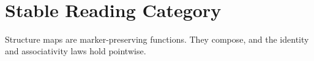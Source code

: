 \documentclass[11pt]{article}
\begin{document}
\begin{code}
\AgdaSpace{}%
\AgdaSpace{}%
\<%
\\
%
\>[2]\AgdaSymbol{;}\AgdaSpace{}%
%
\>[23]\AgdaSymbol{=}\AgdaSpace{}%
\AgdaSpace{}%
\AgdaSpace{}%
\AgdaSpace{}%
\<%
\\
%
\>[2]\AgdaSymbol{;}\AgdaSpace{}%
%
\>[23]\AgdaSymbol{=}\AgdaSpace{}%
\AgdaSpace{}%
\<%
\\
%
\>[2]\AgdaSymbol{;}\AgdaSpace{}%
\AgdaSpace{}%
\AgdaSymbol{=}\AgdaSpace{}%
\AgdaSpace{}%
\<%
\\
%
\>[2]\AgdaSymbol{;}\AgdaSpace{}%
%
\>[23]\AgdaSymbol{=}\AgdaSpace{}%
\AgdaSpace{}%
\<%
\\
%
\>[2]\AgdaSymbol{;}\AgdaSpace{}%
%
\>[23]\AgdaSymbol{=}\AgdaSpace{}%
\AgdaSpace{}%
\<%
\\
%
\>[2]\AgdaSymbol{\}}\<%
\end{code}

\section{Stable Reading Category}

Structure maps are marker-preserving functions.  They compose, and the
identity and associativity laws hold pointwise.
\end{document}
